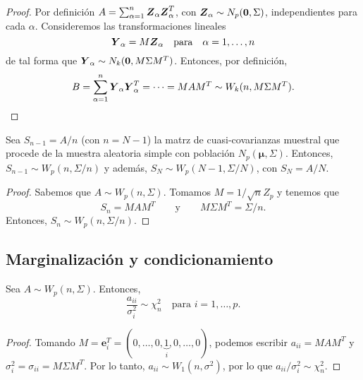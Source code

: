 \begin{proof}
  Por definición \(A = \sum_{\alpha = 1}^n \boldsymbol{Z}_{\alpha}\boldsymbol{Z}_{\alpha}^T\), con \(\boldsymbol{Z}_{\alpha} \sim N_p(\boldsymbol 0, \Sigma)\), independientes para cada \(\alpha\).
  Consideremos las transformaciones lineales
  \[
    \boldsymbol{Y}_{\alpha} = M\boldsymbol{Z}_{\alpha} \quad \text{para}\quad \alpha = 1, \dots, n
  \]
  de tal forma que \(\boldsymbol{Y}_{\alpha} \sim N_k(\boldsymbol 0, M\Sigma M^T)\).
  Entonces, por definición, \begin{align*}
    B = \sum_{\alpha = 1}^n \boldsymbol{Y}_{\alpha}\boldsymbol{Y}_{\alpha}^T = \dots = MAM^T \sim W_k(n, M\Sigma M^T).
  \end{align*}
\end{proof}

\begin{nprop}
  Sea \(S_{n-1} = A/n\) (con \(n = N - 1\)) la matrz de cuasi-covarianzas muestral que procede de la muestra aleatoria simple con población \(N_p(\boldsymbol \mu, \Sigma)\).
  Entonces, \(S_{n-1} \sim W_p(n, \Sigma/n)\) y además, \(S_N \sim W_p(N-1, \Sigma/N)\), con \(S_N = A/N\).
\end{nprop}

\begin{proof}
  Sabemos que \(A \sim W_p(n, \Sigma)\). Tomamos \(M = 1/\sqrt{n} Z_p\) y tenemos que
  \[
    S_n = MAM^T \qquad \text{y} \qquad M\Sigma M^T = \Sigma/n.
  \]
  Entonces, \(S_n \sim W_p(n, \Sigma / n)\).
\end{proof}

\subsection{Marginalización y condicionamiento}

\begin{nprop}
  Sea \(A \sim W_p(n, \Sigma)\). Entonces,
  \[
    \frac{a_{ii}}{\sigma_i^2} \sim \chi_n^2 \quad\text{para } i = 1, \dots, p.
  \]
\end{nprop}

\begin{proof}
  Tomando \(M = \boldsymbol e_i^T = (0, \dots, 0, \underbrace{1}_i, 0, \dots, 0)\), podemos escribir \(a_{ii} = MAM^T\) y \(\sigma_i^2 = \sigma_{ii} = M\Sigma M^T\). Por lo tanto, \(a_{ii} \sim W_1(n, \sigma^2)\), por lo que \(a_{ii}/\sigma_i^2 \sim \chi_n^2\).
\end{proof}

